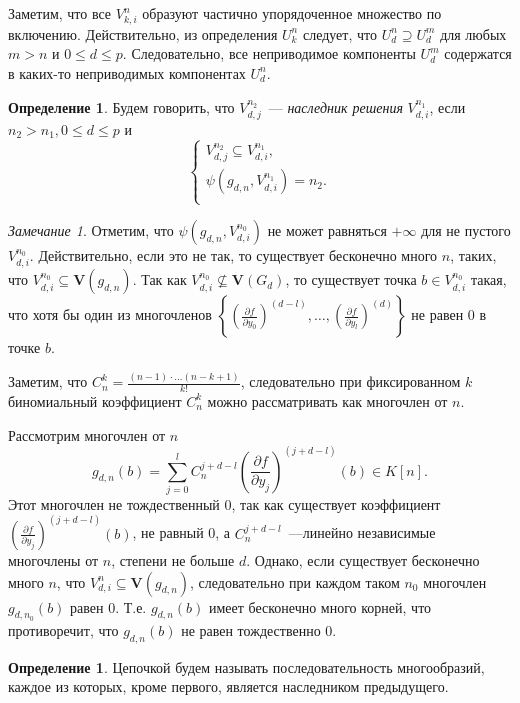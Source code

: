 \documentclass[16pt]{article}
\renewcommand{\le}{\leqslant} %
\theoremstyle{plain1}
\theoremstyle{plain2}
\theoremstyle{plain}
\theoremstyle{plain3}
\theoremstyle{definition}
\newtheorem{definition}[theorem2]{Определение}
\theoremstyle{remark}
\newtheorem{remark}[theorem1]{Замечание}
\begin{document}
Заметим, что все ${V}_{k,i}^n$ образуют частично упорядоченное множество по включению. Действительно, из определения ${U}_{k}^n$ следует, что ${U}_{d}^n\supseteq {U}_{d}^m$ для любых $m >n$ и $0\le d\le p$. Следовательно,
все неприводимое компоненты ${U}_{d}^m$ содержатся в каких-то неприводимых компонентах ${U}_{d}^n$.



\begin{definition}
Будем говорить, что ${V}_{d,j}^{n_2}$~--- \emph{наследник решения} ${V}_{d,i}^{n_1}$, если $n_2>n_1, 0\le d\le p$ и
$$
\left\{
 \begin{aligned}
 {V}_{d,j}^{n_2}\subseteq {V}_{d,i}^{n_1},\\
 \psi(g_{d,n},{V}_{d,i}^{n_1})=n_2.\\
 \end{aligned}
 \right.
$$
\end{definition}

\begin{remark}\label{remark:o_konechnosti_psi}
Отметим, что $\psi(g_{d,n},{V}_{d,i}^{n_0})$ не может равняться $+\infty$  для не пустого ${V}_{d,i}^{n_0}$. Действительно, если это не так, то существует бесконечно много $n$, таких, что ${V}_{d,i}^{n_0}\subseteq \mathbf{V}(g_{d,n})$. Так как ${V}_{d,i}^{n_0} \not\subseteq \mathbf{V}(G_d)$, то существует точка $b\in {V}_{d,i}^{n_0}$ такая, что хотя бы один из многочленов $\left\{\left(\frac{\partial f}{\partial y_0}\right)^{(d-l)},\ldots, \left(\frac{\partial f}{\partial y_l}\right)^{(d)} \right\}$ не равен 0 в точке $b$.

Заметим, что $C_n^k=\frac{(n-1)\cdot\ldots(n-k+1)}{k!}$, следовательно при фиксированном $k$ биномиальный коэффициент $C_n^k$ можно рассматривать как многочлен от $n$.

Рассмотрим многочлен от $n$
$$
g_{d,n}(b)=\sum\limits_{j=0}^{l}C_n^{j+d - l }\left(\frac{\partial f}{\partial y_j}\right)^{(j+d - l)}(b)\in K[n].
$$
Этот многочлен не тождественный 0, так как существует коэффициент $\left(\frac{\partial f}{\partial y_j}\right)^{(j+d - l)}(b)$, не равный 0, а $C_n^{j+d - l }$~---линейно независимые многочлены от $n$, степени не больше $d$. Однако, если существует бесконечно много $n$, что ${V}_{d,i}^n\subseteq \mathbf{V}(g_{d,n})$, следовательно при каждом таком $n_0$ многочлен $g_{d,n_0}(b)$ равен 0. Т.е. $g_{d,n}(b)$ имеет бесконечно много корней, что противоречит, что $g_{d,n}(b)$ не равен тождественно 0.
\end{remark}

\begin{definition}
Цепочкой будем называть последовательность многообразий, каждое  из которых, кроме первого, является наследником предыдущего.
\end{definition}
\end{document}

